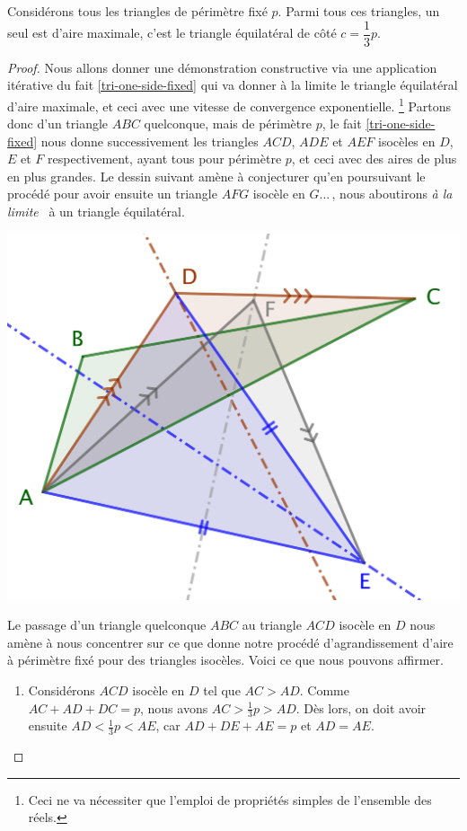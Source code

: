 \begin{fact} \label{iso-tri}
	Considérons tous les triangles de périmètre fixé $p$. Parmi tous ces triangles, un seul est d'aire maximale, c'est le triangle équilatéral de côté $c = \dfrac13 p$.
\end{fact}


\begin{proof}	
	Nous allons donner une démonstration constructive via une application itérative du fait \ref{tri-one-side-fixed} qui va donner à la limite le triangle équilatéral d'aire maximale, et ceci avec une vitesse de convergence exponentielle.%
	\footnote{
		Ceci ne va nécessiter que l'emploi de propriétés simples de l'ensemble des réels.
	}
	Partons donc d'un triangle $ABC$ quelconque, mais de périmètre $p$, le fait \ref{tri-one-side-fixed} nous donne successivement les triangles $ACD$, $ADE$ et $AEF$ isocèles en $D$, $E$ et $F$ respectivement, ayant tous pour périmètre $p$, et ceci avec des aires de plus en plus grandes.  
	Le dessin suivant amène à conjecturer qu'en poursuivant le procédé pour avoir ensuite un triangle $AFG$ isocèle en $G$...\,, nous aboutirons \og \emph{à la limite} \fg\ à un triangle équilatéral.

	\begin{center}
		\includegraphics[scale=.4]{content/triangle-gene/proof.png}
	\end{center} 

	
	Le passage d'un triangle quelconque $ABC$ au triangle $ACD$ isocèle en $D$ nous amène à nous concentrer sur ce que donne notre procédé d'agrandissement d'aire à périmètre fixé pour des triangles isocèles.
	Voici ce que nous pouvons affirmer.
	\begin{enumerate}
		\item Considérons $ACD$ isocèle en $D$ tel que $AC > AD$.
		Comme $AC + AD + DC = p$, nous avons $AC > \frac13p > AD$.
		Dès lors, on doit avoir ensuite  $AD < \frac13p < AE$, car $AD + DE + AE = p$ et $AD = AE$.



\end{enumerate}
\end{proof}
